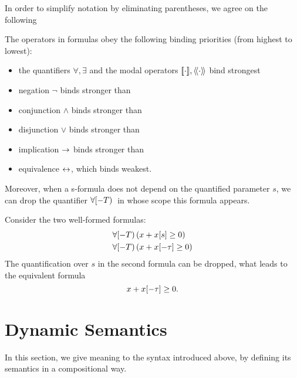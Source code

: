     In order to simplify notation by eliminating parentheses, we agree on the following
    \begin{convention}
        The operators in \ddL formulas obey the following binding priorities (from highest to lowest):
        \begin{itemize}
            \item the quantifiers $\forall,\exists$ and the modal operators $\dbox{\cdot}{},\ddiamond{\cdot}{}$ bind strongest
            \item negation $\lnot$ binds stronger than
            \item conjunction $\land$ binds stronger than 
            \item disjunction $\lor$ binds stronger than
            \item implication $\rightarrow$ binds stronger than
            \item equivalence $\leftrightarrow$, which binds weakest.
        \end{itemize}
    \end{convention}

    Moreover, when a s-formula does not depend on the quantified parameter $s$, we can drop the quantifier $\forall [-T){\,}$ in whose scope this formula appears.

    \begin{example}
        Consider the two well-formed \ddL formulas:
        \begin{align*}
            &\forall [-T){\,} (x+x[s]\geq 0)\\
            &\forall [-T){\,} (x+x[-\tau]\geq 0) 
        \end{align*}
        The quantification over $s$ in the second formula can be dropped, what leads to the equivalent formula
        \begin{equation*}
            x+x[-\tau]\geq 0.
        \end{equation*}
    \end{example}


\section{Dynamic Semantics}
    \label{sec:dynamic-semantics}


    In this section, we give meaning to the syntax introduced above, by defining its semantics in a compositional way.

